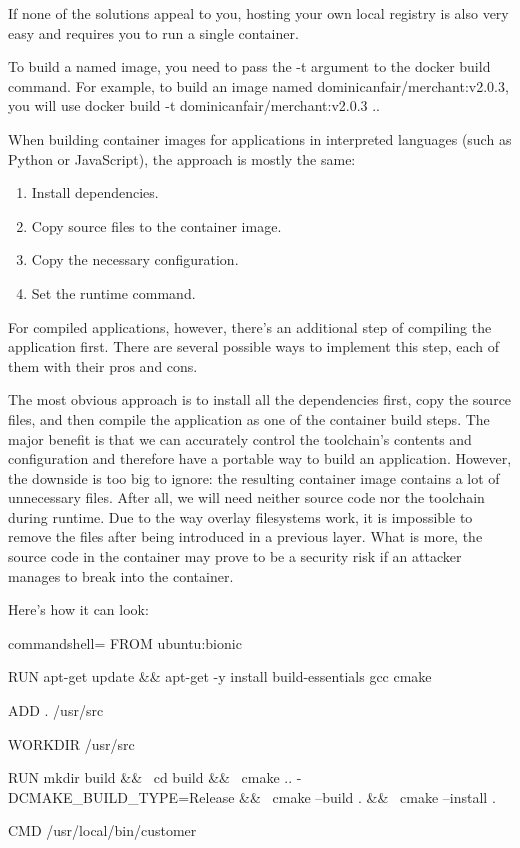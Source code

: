 If none of the solutions appeal to you, hosting your own local registry is also very easy and requires you to run a single container.

To build a named image, you need to pass the -t argument to the docker build command. For example, to build an image named dominicanfair/merchant:v2.0.3, you will use docker build -t dominicanfair/merchant:v2.0.3 ..


When building container images for applications in interpreted languages (such as Python or JavaScript), the approach is mostly the same:

\begin{enumerate}
\item 
Install dependencies.

\item 
Copy source files to the container image.

\item 
Copy the necessary configuration.

\item 
Set the runtime command.
\end{enumerate}

For compiled applications, however, there's an additional step of compiling the application first. There are several possible ways to implement this step, each of them with their pros and cons.

The most obvious approach is to install all the dependencies first, copy the source files, and then compile the application as one of the container build steps. The major benefit is that we can accurately control the toolchain's contents and configuration and therefore have a portable way to build an application. However, the downside is too big to ignore: the resulting container image contains a lot of unnecessary files. After all, we will need neither source code nor the toolchain during runtime. Due to the way overlay filesystems work, it is impossible to remove the files after being introduced in a previous layer. What is more, the source code in the container may prove to be a security risk if an attacker manages to break into the container.

Here's how it can look:

\begin{tcblisting}{commandshell={}}
FROM ubuntu:bionic

RUN apt-get update && apt-get -y install build-essentials gcc cmake

ADD . /usr/src

WORKDIR /usr/src

RUN mkdir build && \
    cd build && \
    cmake .. -DCMAKE_BUILD_TYPE=Release && \
    cmake --build . && \
    cmake --install .
    
CMD /usr/local/bin/customer
\end{tcblisting}

